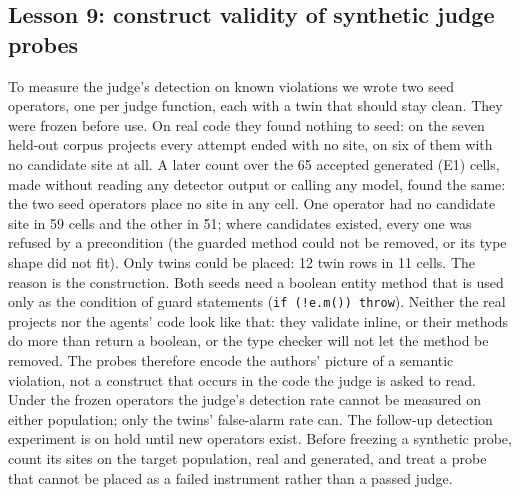 \documentclass[10pt,a4paper]{article}
\begin{document}
\subsection{Lesson 9: construct validity of synthetic judge probes}\label{sec:l9}

To measure the judge's detection on known violations we wrote two seed operators, one per judge function, each with
a twin that should stay clean. They were frozen before use. On real code they found nothing to seed: on the seven
held-out corpus projects every attempt ended with no site, on six of them with no candidate site at all.
A later count over the 65 accepted generated (E1) cells, made without reading any detector output or calling any
model, found the same: the two seed operators place no site in any cell. One operator had no candidate site in 59
cells and the other in 51; where candidates existed, every one was refused by a precondition (the guarded method
could not be removed, or its type shape did not fit). Only twins could be placed: 12 twin rows in 11 cells.
The reason is the construction. Both seeds need a boolean entity method that is used only as the condition of
guard statements (\texttt{if (!e.m()) throw}). Neither the real projects nor the agents' code look like that: they
validate inline, or their methods do more than return a boolean, or the type checker will not let the method be
removed. The probes therefore encode the authors' picture of a semantic violation, not a construct that occurs in
the code the judge is asked to read. Under the frozen operators the judge's detection rate cannot be measured on
either population; only the twins' false-alarm rate can. The follow-up detection experiment is on hold until new
operators exist.
Before freezing a synthetic probe, count its sites on the target population, real and generated, and treat a probe
that cannot be placed as a failed instrument rather than a passed judge.
\end{document}
